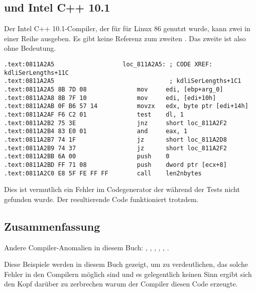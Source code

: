\label{anomaly:Intel}
\myindex{\CompilerAnomaly}

\subsection{ und Intel C++ 10.1}

\myindex{\oracle}

Der Intel C++ 10.1-Compiler, der für  für Linux 86 genutzt wurde, kann
zwei \JZ in einer Reihe ausgeben. Es gibt keine Referenz zum zweiten \JZ. Das zweite
ist also ohne Bedeutung.



\begin{lstlisting}[caption=from the same code,style=customasmx86]
.text:0811A2A5                   loc_811A2A5: ; CODE XREF: kdliSerLengths+11C
.text:0811A2A5                                ; kdliSerLengths+1C1
.text:0811A2A5 8B 7D 08              mov     edi, [ebp+arg_0]
.text:0811A2A8 8B 7F 10              mov     edi, [edi+10h]
.text:0811A2AB 0F B6 57 14           movzx   edx, byte ptr [edi+14h]
.text:0811A2AF F6 C2 01              test    dl, 1
.text:0811A2B2 75 3E                 jnz     short loc_811A2F2
.text:0811A2B4 83 E0 01              and     eax, 1
.text:0811A2B7 74 1F                 jz      short loc_811A2D8
.text:0811A2B9 74 37                 jz      short loc_811A2F2
.text:0811A2BB 6A 00                 push    0
.text:0811A2BD FF 71 08              push    dword ptr [ecx+8]
.text:0811A2C0 E8 5F FE FF FF        call    len2nbytes
\end{lstlisting}

Dies ist vermutlich ein Fehler im Codegenerator der während der Tests nicht
gefunden wurde. Der resultierende Code funktioniert trotzdem.



\subsection{Zusammenfassung}

Andere Compiler-Anomalien in diesem Buch:
, , ,
,
,
.

Diese Beispiele werden in diesem Buch gezeigt, um zu verdeutlichen, das solche Fehler
in den Compilern möglich sind und es gelegentlich keinen Sinn ergibt sich den Kopf
darüber zu zerbrechen warum der Compiler diesen  Code erzeugte.
